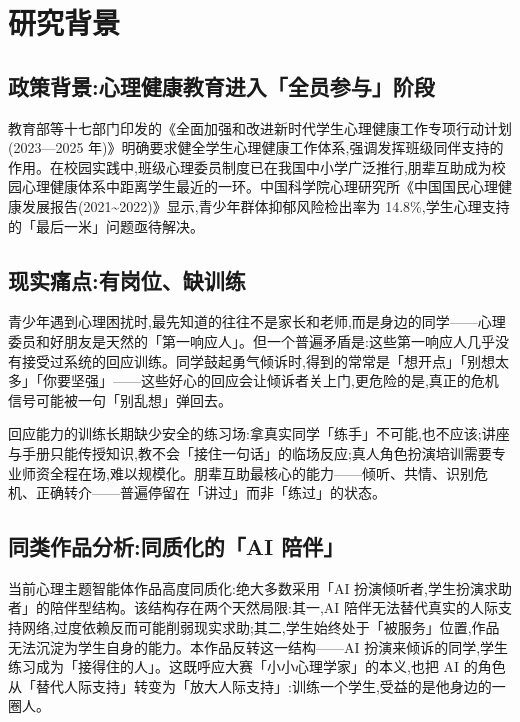 \documentclass[zihao=-4, a4paper]{ctexart}
\begin{document}
\section{研究背景}

\subsection{政策背景:心理健康教育进入「全员参与」阶段}
教育部等十七部门印发的《全面加强和改进新时代学生心理健康工作专项行动计划(2023—2025 年)》明确要求健全学生心理健康工作体系,强调发挥班级同伴支持的作用。在校园实践中,班级心理委员制度已在我国中小学广泛推行,朋辈互助成为校园心理健康体系中距离学生最近的一环。中国科学院心理研究所《中国国民心理健康发展报告(2021\textasciitilde2022)》显示,青少年群体抑郁风险检出率为 14.8\%,学生心理支持的「最后一米」问题亟待解决。

\subsection{现实痛点:有岗位、缺训练}
青少年遇到心理困扰时,最先知道的往往不是家长和老师,而是身边的同学——心理委员和好朋友是天然的「第一响应人」。但一个普遍矛盾是:这些第一响应人几乎没有接受过系统的回应训练。同学鼓起勇气倾诉时,得到的常常是「想开点」「别想太多」「你要坚强」——这些好心的回应会让倾诉者关上门,更危险的是,真正的危机信号可能被一句「别乱想」弹回去。

回应能力的训练长期缺少安全的练习场:拿真实同学「练手」不可能,也不应该;讲座与手册只能传授知识,教不会「接住一句话」的临场反应;真人角色扮演培训需要专业师资全程在场,难以规模化。朋辈互助最核心的能力——倾听、共情、识别危机、正确转介——普遍停留在「讲过」而非「练过」的状态。

\subsection{同类作品分析:同质化的「AI 陪伴」}
当前心理主题智能体作品高度同质化:绝大多数采用「AI 扮演倾听者,学生扮演求助者」的陪伴型结构。该结构存在两个天然局限:其一,AI 陪伴无法替代真实的人际支持网络,过度依赖反而可能削弱现实求助;其二,学生始终处于「被服务」位置,作品无法沉淀为学生自身的能力。本作品反转这一结构——AI 扮演来倾诉的同学,学生练习成为「接得住的人」。这既呼应大赛「小小心理学家」的本义,也把 AI 的角色从「替代人际支持」转变为「放大人际支持」:训练一个学生,受益的是他身边的一圈人。
\end{document}
